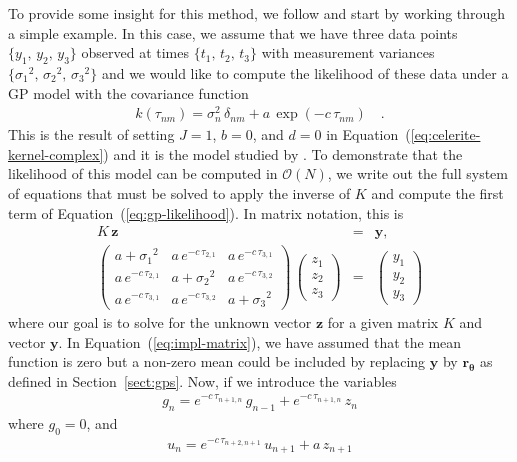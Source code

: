 \documentclass[manuscript, letterpaper]{aastex6}
\renewcommand{\eqref}[1]{\ref{eq:#1}}
\newcommand{\Eq}[1]{Equation~(\eqref{#1})}
\newcommand{\eq}[1]{\Eq{#1}}
\newcommand{\eqlabel}[1]{\label{eq:#1}}
\newcommand{\sectionname}{Section}
\newcommand{\sectref}[1]{\ref{sect:#1}}
\newcommand{\Sect}[1]{\sectionname~\sectref{#1}}
\newcommand{\sect}[1]{\Sect{#1}}
\newcommand{\bvec}[1]{{\ensuremath{\boldsymbol{#1}}}}
\begin{document}
To provide some insight for this method, we follow
\citet{Ambikasaran:2015} and start by working through a simple example.
In this case, we assume that we have three data points
$\{y_1,\,y_2,\,y_3\}$ observed at times $\{t_1,\,t_2,\,t_3\}$ with measurement
variances $\{{\sigma_1}^2,\,{\sigma_2}^2,\,{\sigma_3}^2\}$ and we would
like to compute the likelihood of these data under a GP model with the
covariance function
\begin{eqnarray}
k(\tau_{nm}) = \sigma_n^2\,\delta_{nm} + a\,\exp(-c\,\tau_{nm})\quad.
\end{eqnarray}
This is the result of setting $J=1$, $b=0$, and $d=0$ in
\eq{celerite-kernel-complex} and it is the model studied by
\citet{Rybicki:1995}.
To demonstrate that the likelihood of this model can be computed in
$\mathcal{O}(N)$, we write out the full system of
equations that must be solved to apply the inverse of $K$ and compute
the first term of \eq{gp-likelihood}.
In matrix notation, this is
\begin{eqnarray}\eqlabel{impl-matrix}
K\,\bvec{z} &=& \bvec{y}, \\
\begin{pmatrix}
    a+{\sigma_1}^2 & a\,e^{-c\,\tau_{2,1}} & a\,e^{-c\,\tau_{3,1}}\\
    a\,e^{-c\,\tau_{2,1}} & a+{\sigma_2}^2 & a\,e^{-c\,\tau_{3,2}}\\
    a\,e^{-c\,\tau_{3,1}} & a\,e^{-c\,\tau_{3,2}} & a+{\sigma_3}^2
\end{pmatrix}\,
\begin{pmatrix}
    z_1 \\ z_2 \\ z_3
\end{pmatrix} &=&
\begin{pmatrix}
    y_1 \\ y_2 \\ y_3
\end{pmatrix}
\end{eqnarray}
where our goal is to solve for the unknown vector \bvec{z} for a given matrix
$K$ and vector \bvec{y}.
In \eq{impl-matrix}, we have assumed that the mean function is zero but a
non-zero mean could be included by replacing \bvec{y} by
$\bvec{r}_\bvec{\theta}$ as defined in \sect{gps}.
Now, if we introduce the variables
\begin{eqnarray}
    g_n = e^{-c\,\tau_{n+1,n}}\,g_{n-1} + e^{-c\,\tau_{n+1,n}}\,z_{n}
\end{eqnarray}
where $g_{0} = 0$, and
\begin{eqnarray}\eqlabel{algo-first}
    u_n = e^{-c\,\tau_{n+2,n+1}}\,u_{n+1} + a\,z_{n+1}
\end{eqnarray}
\end{document}
